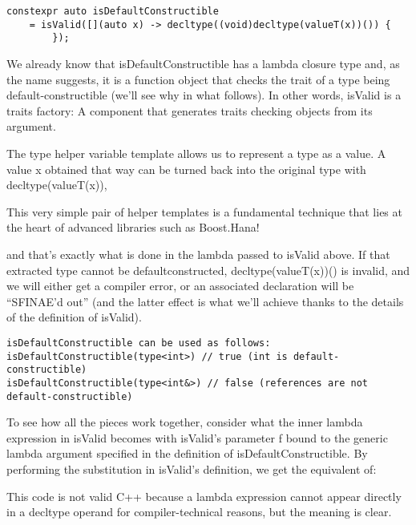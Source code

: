 \begin{lstlisting}[style=styleCXX]
constexpr auto isDefaultConstructible
	= isValid([](auto x) -> decltype((void)decltype(valueT(x))()) {
		});
\end{lstlisting}

We already know that isDefaultConstructible has a lambda closure type and, as the name suggests, it is a function object that checks the trait of a type being default-constructible (we’ll see why in what follows). In other words, isValid is a traits factory: A component that generates traits checking objects from its argument.

The type helper variable template allows us to represent a type as a value. A value x obtained that way can be turned back into the original type with decltype(valueT(x)),

\begin{tcolorbox}[colback=webgreen!5!white,colframe=webgreen!75!black]
\hspace*{0.75cm}This very simple pair of helper templates is a fundamental technique that lies at the heart of advanced libraries such as Boost.Hana!
\end{tcolorbox}

and that’s exactly what is done in the lambda passed to isValid above. If that extracted type cannot be defaultconstructed, decltype(valueT(x))() is invalid, and we will either get a compiler error, or an associated declaration will be “SFINAE’d out” (and the latter effect is what we’ll achieve thanks to the details of the definition of isValid).

\begin{lstlisting}[style=styleCXX]
isDefaultConstructible can be used as follows:
isDefaultConstructible(type<int>) // true (int is default-constructible)
isDefaultConstructible(type<int&>) // false (references are not default-constructible)
\end{lstlisting}

To see how all the pieces work together, consider what the inner lambda expression in isValid becomes with isValid’s parameter f bound to the generic lambda argument specified in the definition of isDefaultConstructible. By performing the substitution in isValid’s definition, we get the equivalent of:

\begin{tcolorbox}[colback=webgreen!5!white,colframe=webgreen!75!black]
\hspace*{0.75cm}This code is not valid C++ because a lambda expression cannot appear directly in a decltype operand for compiler-technical reasons, but the meaning is clear.
\end{tcolorbox}

